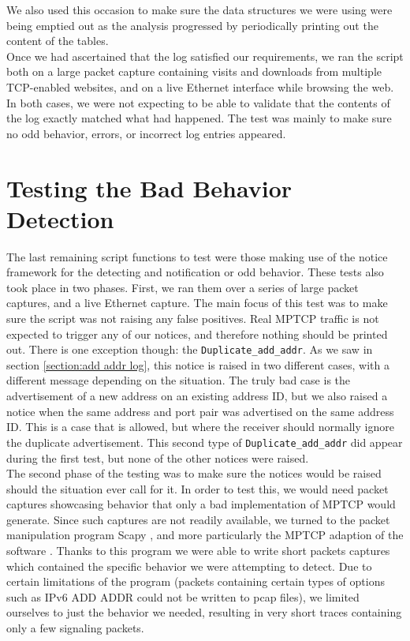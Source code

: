 We also used this occasion to make sure the data structures we were using were being emptied out as the analysis progressed by periodically printing out the content of the tables. \\

Once we had ascertained that the log satisfied our requirements, we ran the script both on a large packet capture containing visits and downloads from multiple TCP-enabled websites, and on a live Ethernet interface while browsing the web. In both cases, we were not expecting to be able to validate that the contents of the log exactly matched what had happened. The test was mainly to make sure no odd behavior, errors, or incorrect log entries appeared.

\section{Testing the Bad Behavior Detection}
The last remaining script functions to test were those making use of the notice framework for the detecting and notification or odd behavior. These tests also took place in two phases. First, we ran them over a series of large packet captures, and a live Ethernet capture. The main focus of this test was to make sure the script was not raising any false positives. Real MPTCP traffic is not expected to trigger any of our notices, and therefore nothing should be printed out. There is one exception though: the \texttt{Duplicate\_add\_addr}. As we saw in section \ref{section:add addr log}, this notice is raised in two different cases, with a different message depending on the situation. The truly bad case is the advertisement of a new address on an existing address ID, but we also raised a notice when the same address and port pair was advertised on the same address ID. This is a case that is allowed, but where the receiver should normally ignore the duplicate advertisement. This second type of \texttt{Duplicate\_add\_addr} did appear during the first test, but none of the other notices were raised. \\

The second phase of the testing was to make sure the notices would be raised should the situation ever call for it.  In order to test this, we would need packet captures showcasing behavior that only a bad implementation of MPTCP would generate. Since such captures are not readily available, we turned to the packet manipulation program Scapy \citep{scapy}, and more particularly the MPTCP adaption of the software \citep{mpscapy}. Thanks to this program we were able to write short packets captures which contained the specific behavior we were attempting to detect. Due to certain limitations of the program (packets containing certain types of options such as IPv6 ADD ADDR could not be written to pcap files), we limited ourselves to just the behavior we needed, resulting in very short traces containing only a few signaling packets.\\

